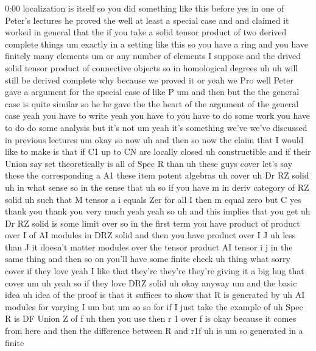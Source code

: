 \begin{unfinished}{0:00}
localization  is  itself
so  you  did  something  like  this  before
yes  in  one  of  Peter's  lectures
he  proved  the  well  at  least  a  special
case  and  and  claimed  it  worked  in
general  that  the  if  you  take  a  solid
tensor  product  of  two  derived  complete
things  um  exactly  in  a  setting  like  this
so  you  have  a  ring  and  you  have  finitely
many
elements  um  or  any  number  of  elements  I
suppose  and  the  drived  solid  tensor
product  of  connective  objects  so  in
homological  degrees  uh  uh  will  still  be
derived  complete  why  because  we  proved
it  or  yeah  we  Pro  well  Peter  gave  a
argument  for  the  special  case  of  like  P
um  and  then  but  the  the  general  case  is
quite  similar  so  he  he  gave  the  the
heart  of  the  argument  of  the  general
case  yeah  you  have  to  write  yeah  you
have  to  you  have  to  do  some  work  you
have  to  do  do  some  analysis  but  it's  not
um  yeah  it's  something  we've  we've
discussed  in  previous
lectures
um  okay  so  now  uh  and
then  so  now  the  claim  that  I  would  like
to  make  is  that  if
C1  up  to  CN  are  locally
closed  uh
constructible  and  if  their
Union  say  set
theoretically  is  all  of  Spec  R
than  uh  these  guys
cover  let's  say
these  the  corresponding  a  A1  these  item
potent
algebras  uh  cover
uh  Dr  RZ
solid  uh  in  what  sense  so  in  the  sense
that
uh  so  if  you  have  m  in  deriv  category  of
RZ  solid  uh  such  that  M  tensor  a  i
equals  Zer  for  all  I  then  m  equal
zero
but  C  yes  thank  you  thank  you  very  much
yeah
yeah  so  uh  and  this  implies  that  you  get
uh  Dr  RZ  solid  is  some  limit  over  so  in
the  first  term  you  have  product  of
product  over  I  of  AI  modules  in  DRZ
solid  and  then  you  have  product  over  I  J
uh  less  than  J  it  doesn't  matter  modules
over  the  tensor  product  AI  tensor  i  j  in
the  same  thing  and  then  so  on  you'll
have  some  finite
check  uh
thing  what  sorry  cover  if  they  love
yeah
I  like  that  they're  they're  they're
giving  it  a  big  hug  that
cover
um  uh  yeah  so  if  they  love  DRZ  solid
uh  okay
anyway
um  and  the  basic  idea  uh  idea  of  the
proof  is  that  it  suffices  to
show  that  R  is  generated  by
uh  AI
modules  for  varying
I
um  but
um  so  so  for  if  I  just  take  the  example
of  uh  Spec
R  is  DF  Union  Z  of  f  uh  then  you  use
then  r  1  over  f  is  okay
because  it  comes  from  here  and  then  the
difference  between  R  and
r1f  uh  is  um  so  generated  in  a  finite

\end{unfinished}
